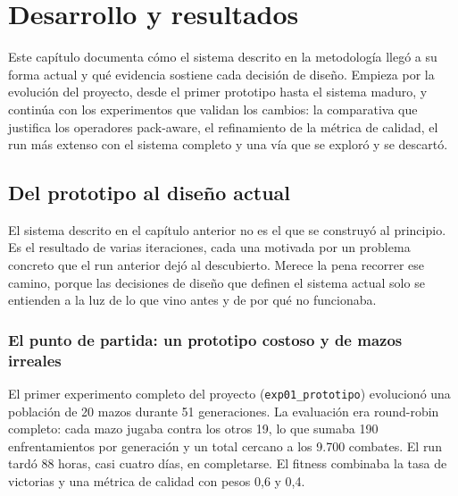 
\chapter{Desarrollo y resultados}
\label{cap:desarrollo}

Este capítulo documenta cómo el sistema descrito en la metodología llegó a su forma actual y qué evidencia sostiene cada decisión de diseño. Empieza por la evolución del proyecto, desde el primer prototipo hasta el sistema maduro, y continúa con los experimentos que validan los cambios: la comparativa que justifica los operadores pack-aware, el refinamiento de la métrica de calidad, el run más extenso con el sistema completo y una vía que se exploró y se descartó.

\section{Del prototipo al diseño actual}
\label{sec:evolucion}

El sistema descrito en el capítulo anterior no es el que se construyó al principio. Es el resultado de varias iteraciones, cada una motivada por un problema concreto que el run anterior dejó al descubierto. Merece la pena recorrer ese camino, porque las decisiones de diseño que definen el sistema actual solo se entienden a la luz de lo que vino antes y de por qué no funcionaba.

\subsection{El punto de partida: un prototipo costoso y de mazos irreales}

El primer experimento completo del proyecto (\texttt{exp01\_prototipo}) evolucionó una población de 20 mazos durante 51 generaciones. La evaluación era round-robin completo: cada mazo jugaba contra los otros 19, lo que sumaba 190 enfrentamientos por generación y un total cercano a los 9.700 combates. El run tardó 88 horas, casi cuatro días, en completarse. El fitness combinaba la tasa de victorias y una métrica de calidad con pesos 0,6 y 0,4.


